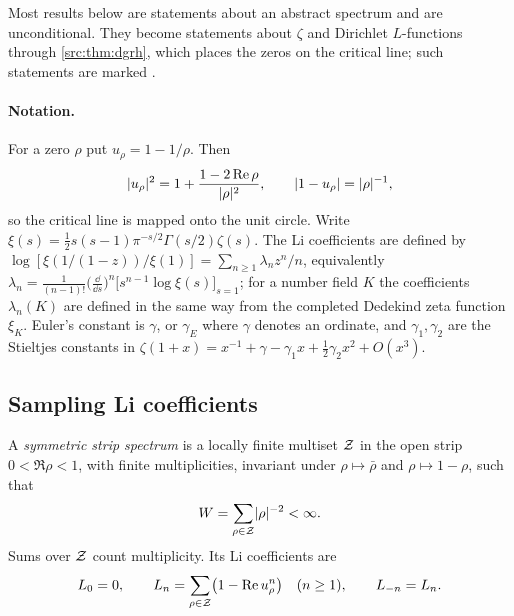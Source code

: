 Most results below are statements about an abstract spectrum and are unconditional. They
become statements about $\zeta$ and Dirichlet $L$-functions through \cref{src:thm:dgrh},
which places the zeros on the critical line; such statements are marked \stG.

\paragraph{Notation.} For a zero $\rho$ put $u_\rho=1-1/\rho$. Then
\begin{equation}\label{li:eq:cayley}
 \lvert u_\rho\rvert^2=1+\frac{1-2\operatorname{Re}\rho}{\lvert\rho\rvert^2},\qquad \lvert1-u_\rho\rvert=\lvert\rho\rvert^{-1},
\end{equation}
so the critical line is mapped onto the unit circle. Write
$\xi(s)=\frac12s(s-1)\pi^{-s/2}\Gamma(s/2)\zeta(s)$. The Li coefficients are defined by
$\log[\xi(1/(1-z))/\xi(1)]=\sum_{n\ge1}\lambda_nz^n/n$, equivalently
$\lambda_n=\frac1{(n-1)!}\bigl(\frac{\dd}{\dd s}\bigr)^n\bigl[s^{n-1}\log\xi(s)\bigr]_{s=1}$;
for a number field $K$ the coefficients $\lambda_n(K)$ are defined in the same way from the
completed Dedekind zeta function $\xi_K$. Euler's constant is $\gamma$, or $\gamma_E$ where
$\gamma$ denotes an ordinate, and $\gamma_1,\gamma_2$ are the Stieltjes constants in
$\zeta(1+x)=x^{-1}+\gamma-\gamma_1x+\frac12\gamma_2x^2+O(x^3)$.

\subsection{Sampling Li coefficients}\label{li:sec:sampling}

\begin{definition}\label{li:def:spectrum}
A \emph{symmetric strip spectrum} is a locally finite multiset $\mathcal{Z}$ in the open strip
$0<\Re\rho<1$, with finite multiplicities, invariant under $\rho\mapsto\bar\rho$ and
$\rho\mapsto1-\rho$, such that
\begin{equation}\label{li:eq:spectrum}
 W=\sum_{\rho\in\mathcal{Z}}\lvert\rho\rvert^{-2}<\infty .
\end{equation}
Sums over $\mathcal{Z}$ count multiplicity. Its Li coefficients are
\begin{equation}\label{li:eq:Ln}
 L_0=0,\qquad L_n=\sum_{\rho\in\mathcal{Z}}\bigl(1-\operatorname{Re} u_\rho^n\bigr)\quad(n\ge1),\qquad L_{-n}=L_n .
\end{equation}
\end{definition}

